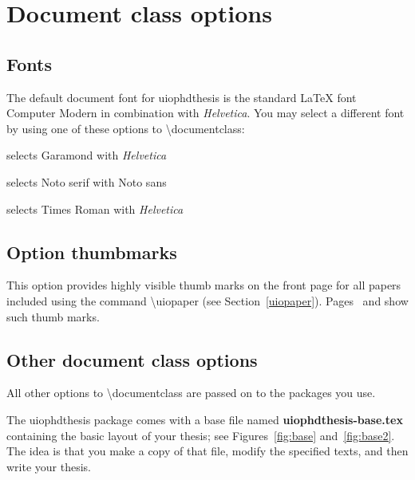 \documentclass[UKenglish, thumbmarks]{uiophdthesis}
\newcommand{\bsl}{\textbackslash}
\newcommand{\p}[1]{\textsf{#1}}
\newcommand{\pb}[1]{\textbf{\p{#1}}}
\newcommand{\pcmd}[1]{\p{\bsl #1}}
\newcommand{\tighterlist}{\addtolength{\itemsep}{-1ex}}
\begin{document}
\section{Document class options}

\subsection{Fonts\label{font}}
The default document font for \p{uiophdthesis} is the standard \LaTeX{} font
{\selectfont Computer Modern} in
combination with \textsf{\textit{Helvetica}}.
You may select a different font by using one of these
options to \pcmd{documentclass}:
\begin{description}\tighterlist
\item[\p{font=garamond}] selects
  {\selectfont Garamond} with
  \textsf{\textit{Helvetica}}
  
\item[\p{font=noto}] selects
  {\selectfont Noto serif} with
  {\selectfont Noto sans}

\item[\p{font=times}] selects
  {\selectfont Times Roman} with
  \textsf{\textit{Helvetica}}
\end{description}

\subsection{Option \p{thumbmarks}\label{lab:thumbmarks}}
This option provides highly visible thumb marks on the front page for
all papers included using the command \pcmd{uiopaper}
(see Section~\vref{uiopaper}). Pages~\pageref{info-part} and
\pageref{part:example} show such thumb marks.

\subsection{Other document class options}
All other options to \pcmd{documentclass} are passed on to
the packages you use.

\noindent
The \p{uiophdthesis} package comes with a base file named
\pb{uiophdthesis-base.tex} containing the basic layout of your thesis;
see Figures~\vref{fig:base} and~\vref{fig:base2}.
  The idea is that you make a copy of that
  file, modify the specified texts, and then write your thesis.
\end{document}
